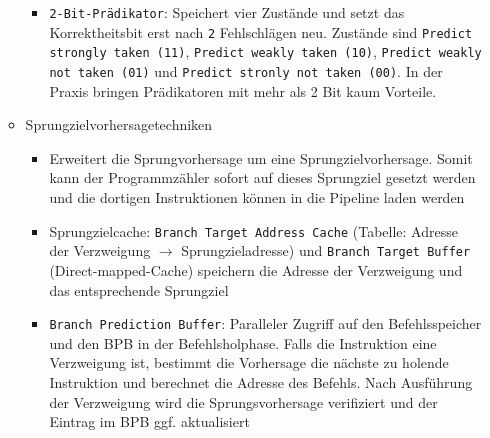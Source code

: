 \begin{itemize}
\begin{itemize}
\begin{itemize}
			\item \texttt{2-Bit-Prädikator}: Speichert vier Zustände und setzt das Korrektheitsbit erst nach \texttt{2} Fehlschlägen neu. Zustände sind \texttt{Predict strongly taken (11)}, \texttt{Predict weakly taken (10)}, \texttt{Predict weakly not taken (01)} und \texttt{Predict stronly not taken (00)}. In der Praxis bringen Prädikatoren mit mehr als 2 Bit kaum Vorteile.
		\end{itemize}
		\item Sprungzielvorhersagetechniken
		\begin{itemize}
			\item Erweitert die Sprungvorhersage um eine Sprungzielvorhersage. Somit kann der Programmzähler sofort auf dieses Sprungziel gesetzt werden und die dortigen Instruktionen können in die Pipeline laden werden
			\item Sprungzielcache: \texttt{Branch Target Address Cache} (Tabelle: Adresse der Verzweigung \(\rightarrow\) Sprungzieladresse) und \texttt{Branch Target Buffer} (Direct-mapped-Cache) speichern die Adresse der Verzweigung und das entsprechende Sprungziel
			\item \texttt{Branch Prediction Buffer}: Paralleler Zugriff auf den Befehlsspeicher und den BPB in der Befehlsholphase. Falls die Instruktion eine Verzweigung ist, bestimmt die Vorhersage die nächste zu holende Instruktion und berechnet die Adresse des Befehls. Nach Ausführung der Verzweigung wird die Sprungsvorhersage verifiziert und der Eintrag im BPB ggf. aktualisiert
		\end{itemize}
	\end{itemize}
\end{itemize}

